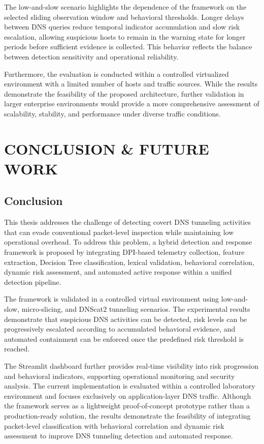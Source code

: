 \documentclass[14pt, a4paper, oneside]{report}
\begin{document}
The low-and-slow scenario highlights the dependence of the framework on the selected sliding observation window and behavioral thresholds. Longer delays between DNS queries reduce temporal indicator accumulation and slow risk escalation, allowing suspicious hosts to remain in the warning state for longer periods before sufficient evidence is collected. This behavior reflects the balance between detection sensitivity and operational reliability.

Furthermore, the evaluation is conducted within a controlled virtualized environment with a limited number of hosts and traffic sources. While the results demonstrate the feasibility of the proposed architecture, further validation in larger enterprise environments would provide a more comprehensive assessment of scalability, stability, and performance under diverse traffic conditions.

\chapter{CONCLUSION \& FUTURE WORK}
\label{chapt:conclusion}
\section{Conclusion}

This thesis addresses the challenge of detecting covert DNS tunneling activities that can evade conventional packet-level inspection while maintaining low operational overhead. To address this problem, a hybrid detection and response framework is proposed by integrating DPI-based telemetry collection, feature extraction, Decision Tree classification, lexical validation, behavioral correlation, dynamic risk assessment, and automated active response within a unified detection pipeline.

The framework is validated in a controlled virtual environment using low-and-slow, micro-slicing, and DNScat2 tunneling scenarios. The experimental results demonstrate that suspicious DNS activities can be detected, risk levels can be progressively escalated according to accumulated behavioral evidence, and automated containment can be enforced once the predefined risk threshold is reached.

The Streamlit dashboard further provides real-time visibility into risk progression and behavioral indicators, supporting operational monitoring and security analysis. The current implementation is evaluated within a controlled laboratory environment and focuses exclusively on application-layer DNS traffic. Although the framework serves as a lightweight proof-of-concept prototype rather than a production-ready solution, the results demonstrate the feasibility of integrating packet-level classification with behavioral correlation and dynamic risk assessment to improve DNS tunneling detection and automated response.
\end{document}
